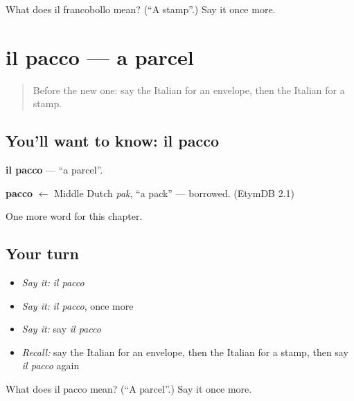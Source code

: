 \begin{tcolorbox}[breakable,colback=teal!4,colframe=teal!35!black,title={Before you move on}]
What does il francobollo mean? (\textquotedblleft{}A stamp\textquotedblright{}.) Say it once more.
\end{tcolorbox}
\section[il pacco]{il pacco — a parcel}

\label{lesson:IT-C166-pacco}



\begin{quote}
Before the new one: say the Italian for an envelope, then the Italian for a stamp.
\end{quote}

\subsection*{You'll want to know: il pacco}
\textbf{il pacco} — \textquotedblleft{}a parcel\textquotedblright{}.

\begin{cousinweb}
\textbf{pacco} $\leftarrow$ Middle Dutch \emph{pak}, \textquotedblleft{}a pack\textquotedblright{} — borrowed. (EtymDB 2.1)
\end{cousinweb}

\begin{grammarlens}[title={What you've built}]
One more word for this chapter.
\end{grammarlens}

\subsection*{Your turn}
\begin{itemize}
\raggedright
  \item \emph{Say it:} \emph{il pacco}
  \item \emph{Say it:} \emph{il pacco}, once more
  \item \emph{Say it:} say \emph{il pacco}
  \item \emph{Recall:} say the Italian for an envelope, then the Italian for a stamp, then say \emph{il pacco} again
\end{itemize}

\begin{tcolorbox}[breakable,colback=teal!4,colframe=teal!35!black,title={Before you move on}]
What does il pacco mean? (\textquotedblleft{}A parcel\textquotedblright{}.) Say it once more.
\end{tcolorbox}

